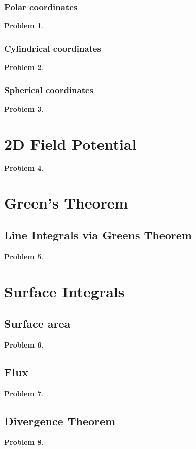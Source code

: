 \documentclass{article}
\newtheorem{problem}{Problem}
\begin{document}
\subsubsection{Polar coordinates}
\begin{problem}

\end{problem}
\subsubsection{Cylindrical coordinates}
\begin{problem}

\end{problem}
\subsubsection{Spherical coordinates}
\begin{problem}

\end{problem}
\section{2D Field Potential}
\begin{problem}

\end{problem}
\section{Green's Theorem}
\subsection{Line Integrals via Greens Theorem}
\begin{problem}

\end{problem}
\section{Surface Integrals}
\subsection{Surface area}
\begin{problem}

\end{problem}
\subsection{Flux}
\begin{problem}

\end{problem}
\subsection{Divergence Theorem}
\begin{problem}

\end{problem}
\end{document}
